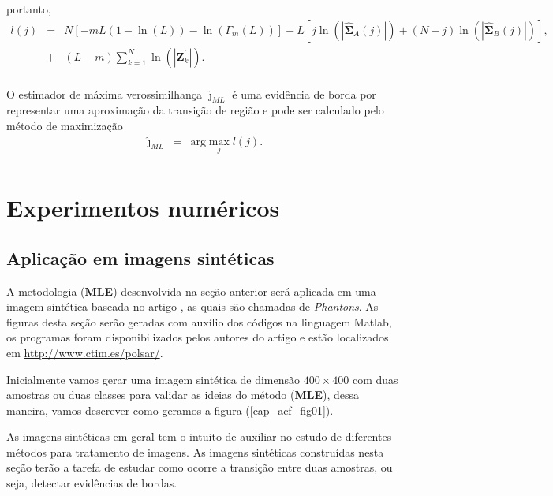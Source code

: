 portanto, 
\begin{equation}\label{cap_acf_21}
\begin{array}{rcl}
	l(j)&=&N\left[-mL(1-\ln{\left(L\right)})-\ln{\left(\Gamma_m(L)\right)}\right]-L\left[j\ln{\left(|\mathbf{\widehat{\Sigma}}_{A}(j)|\right)} +(N-j)\ln{\left(|\mathbf{\widehat{\Sigma}}_{B}(j)|\right)}\right], \\
	&+&(L-m)\sum_{k=1}^{N}\ln{\left(|\mathbf{Z}_{k}^{'}|\right)}. \\
\end{array}
\end{equation}

O estimador de máxima verossimilhança $\widehat{\jmath}_{ML}$ é uma evidência de borda por representar uma aproximação da transição de região e pode ser calculado pelo método de maximização
\begin{equation}\label{cap_acf_22}
\begin{array}{rcl}
	\widehat{\jmath}_{ML}&=&\text{arg}\max\limits_{j}l(j).  \\
\end{array}
\end{equation}
\chapter{Experimentos numéricos}
\section{Aplicação em imagens sintéticas}\label{cap_acf_sec4}

A metodologia (\textbf{MLE}) desenvolvida na seção anterior será aplicada em uma imagem sintética baseada no artigo \citep{gamf}, as quais são chamadas de \textit{Phantons}. As figuras desta seção serão geradas com auxílio dos códigos na linguagem Matlab, os programas foram disponibilizados pelos autores do artigo e estão localizados em  \url{http://www.ctim.es/polsar/}.

Inicialmente vamos gerar uma imagem sintética de dimensão $400\times400$ com duas amostras ou duas classes para validar as ideias do método (\textbf{MLE}), dessa maneira, vamos descrever como geramos a figura (\ref{cap_acf_fig01}). 

As imagens sintéticas em geral tem o intuito de auxiliar no estudo de diferentes métodos para tratamento de imagens. As imagens sintéticas construídas nesta seção  terão a tarefa de estudar como ocorre a transição entre duas amostras, ou seja, detectar evidências de bordas. 

